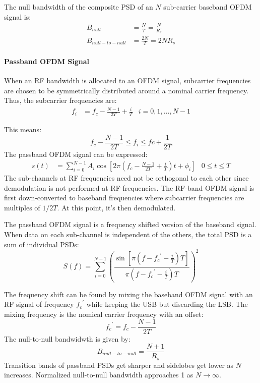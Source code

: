 The null bandwidth of the composite \gls{PSD} of an \(N\) sub-carrier baseband OFDM signal is:
\begin{align*}
	B_{null} &= \frac{N}{T} = \frac{N}{R_s} \\
	B_{null-to-null} &= \frac{2N}{T} = 2NR_s
\end{align*}

\paragraph{Passband OFDM Signal}

When an \gls{RF} bandwidth is allocated to an OFDM signal, subcarrier frequencies are chosen to be symmetrically distributed around a nominal carrier frequency. Thus, the subcarrier frequencies are:
\begin{align*}
	f_i &= f_c - \frac{N-1}{2T} + \frac{i}{T} & i = 0,1,\ldots,N-1
\end{align*}
\begin{mathDef}
\end{mathDef}
This means:
\[
	f_c - \frac{N-1}{2T} \leq f_i \leq fc + \frac{1}{2T}
\]
The passband OFDM signal can be expressed:
\begin{align*}
	s(t) &= \sum_{i=0}^{N-1} A_i \cos \left[ 2\pi \left( f_c - \frac{N-1}{2T} + \frac{i}{T}\right)t + \phi_i \right] & 0 \leq t \leq T
\end{align*}
The sub-channels at \gls{RF} frequencies need not be orthogonal to each other since demodulation is not performed at RF frequencies\cite{fuqin}. The RF-band OFDM signal is first down-converted to baseband frequencies where subcarrier frequencies are multiples of \(1/2T\)\cite{fuqin}. At this point, it's then demodulated.

The passband OFDM signal is a frequency shifted version of the baseband signal. When data on each sub-channel is independent of the others, the total \gls{PSD} is a sum of individual PSDs:
\[
	S(f) = \sum_{i=0}^{N-1} \left( \frac{\sin \left[ \pi(f - {f_c}^\prime - \frac{i}{T})T \right]}{\pi(f - {f_c}^\prime - \frac{i}{T})T} \right)^2
\]
\begin{mathDef}
\end{mathDef}
The frequency shift can be found by mixing the baseband OFDM signal with an \gls{RF} signal of frequency \({f_c}^\prime\) while keeping the \gls{USB} but discarding the \gls{LSB}. The mixing frequency is the nomical carrier frequency with an offset:
\[
	{f_c}^\prime = f_c - \frac{N-1}{2T}
\]
The null-to-null bandwidwth is given by:
\[
	B_{null-to-null} = \frac{N + 1}{R_s}
\]
Transition bands of passband PSDs get sharper and sidelobes get lower as \(N\) increases. Normalized null-to-null bandwidth approaches 1 as \(N\to\infty\)\cite{fuqin}.

